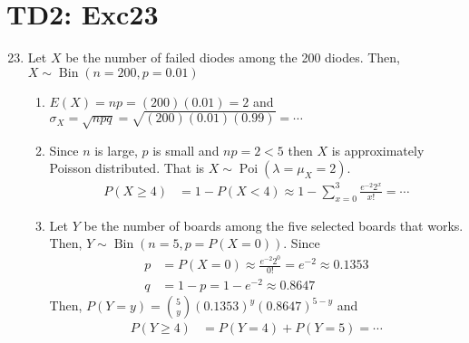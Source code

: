 \documentclass[serif,handout,t]{beamer}
\begin{document}
    \section{TD2: Exc23}
    \begin{frame}[allowframebreaks]
        \begin{enumerate}
            \setcounter{enumi}{22}
            \item Let $ X $ be the number of failed diodes among the 200 diodes. Then, $ X\sim\operatorname{Bin}(n=200,p=0.01) $
            \begin{enumerate}[a]
                \item $ E(X)=np=(200)(0.01)=2 $ and $ \sigma_{X}=\sqrt{npq}=\sqrt{(200)(0.01)(0.99)}=\cdots $
                \item Since $ n $ is large, $ p $ is small and $ np=2<5 $ then $ X $ is approximately Poisson distributed. That is $ X\sim\operatorname{Poi}(\lambda=\mu_{X}=2). $
                \begin{align*}
                P(X\geq 4) &=1-P(X<4)\approx 1-\sum_{x=0}^{3} \frac{e^{-2}2^{x}}{x!}=\cdots
                \end{align*}
                \item Let $ Y $ be the number of boards among the five selected boards that works. Then, $ Y\sim\operatorname{Bin}(n=5,p=P(X=0)). $ Since
                \begin{align*}
                p &=P(X=0)\approx \frac{e^{-2}2^{0}}{0!}=e^{-2}\approx 0.1353\\
                q &=1-p=1-e^{-2}\approx 0.8647
                \end{align*}
                Then, $ P(Y=y)=\binom{5}{y}(0.1353)^{y}(0.8647)^{5-y} $ and
                \begin{align*}
                P(Y\geq 4) &=P(Y=4)+P(Y=5)=\cdots
                \end{align*}
            \end{enumerate}
        \end{enumerate}
    \end{frame}
\end{document}
